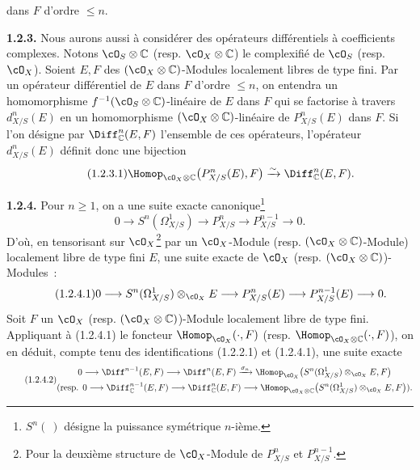 dans $F$ d'ordre $\le n$.

\textbf{1.2.3.} Nous aurons aussi à considérer des opérateurs différentiels à coefficients complexes. Notons $\cO_S\otimes\mathbb C$ (resp. $\cO_X\otimes\mathbb C$) le complexifié de $\cO_S$ (resp. $\cO_X$). Soient $E,F$ des $(\cO_X\otimes\mathbb C)$-Modules localement libres de type fini. Par un opérateur différentiel de $E$ dans $F$ d'ordre $\le n$, on entendra un homomorphisme $f^{-1}(\cO_S\otimes\mathbb C)$-linéaire de $E$ dans $F$ qui se factorise à travers $d^n_{X/S}(E)$ en un homomorphisme $(\cO_X\otimes\mathbb C)$-linéaire de $P^n_{X/S}(E)$ dans $F$. Si l'on désigne par $\Diff^n_\mathbb C(E,F)$ l'ensemble de ces opérateurs, l'opérateur $d^n_{X/S}(E)$ définit donc une bijection
\begin{equation}\tag{1.2.3.1}
  \Homop_{\cO_X\otimes\mathbb C}\bigl(P^n_{X/S}(E),F\bigr)
  \xrightarrow{\sim}
  \Diff^n_\mathbb C(E,F).
\end{equation}

\textbf{1.2.4.} Pour $n\ge1$, on a une suite exacte canonique\footnote{$S^n(\ )$ désigne la puissance symétrique $n$-ième.}
\[
  0\longrightarrow S^n(\Omega^1_{X/S})
  \longrightarrow P^n_{X/S}
  \longrightarrow P^{n-1}_{X/S}
  \longrightarrow 0.
\]
D'où, en tensorisant sur $\cO_X$\footnote{Pour la deuxième structure de $\cO_X$-Module de $P^n_{X/S}$ et $P^{n-1}_{X/S}$.} par un $\cO_X$-Module (resp. $(\cO_X\otimes\mathbb C)$-Module) localement libre de type fini $E$, une suite exacte de $\cO_X$ (resp. $(\cO_X\otimes\mathbb C)$)-Modules~:
\begin{equation}\tag{1.2.4.1}
  0\longrightarrow S^n(\Omega^1_{X/S})\otimes_{\cO_X}E
  \longrightarrow P^n_{X/S}(E)
  \longrightarrow P^{n-1}_{X/S}(E)
  \longrightarrow 0.
\end{equation}
Soit $F$ un $\cO_X$ (resp. $(\cO_X\otimes\mathbb C)$)-Module localement libre de type fini. Appliquant à (1.2.4.1) le foncteur $\Homop_{\cO_X}(\cdot,F)$ (resp. $\Homop_{\cO_X\otimes\mathbb C}(\cdot,F)$), on en déduit, compte tenu des identifications (1.2.2.1) et (1.2.4.1), une suite exacte
\begin{equation}\tag{1.2.4.2}
\begin{gathered}
  0\longrightarrow \Diff^{n-1}(E,F)
  \longrightarrow \Diff^n(E,F)
  \xrightarrow{\sigma_n}
  \Homop_{\cO_X}\bigl(S^n(\Omega^1_{X/S})\otimes_{\cO_X}E,F\bigr)\\
  (\text{resp. } 0\longrightarrow \Diff^{n-1}_\mathbb C(E,F)
  \longrightarrow \Diff^n_\mathbb C(E,F)
  \longrightarrow
  \Homop_{\cO_X\otimes\mathbb C}\bigl(S^n(\Omega^1_{X/S})\otimes_{\cO_X}E,F\bigr)).
\end{gathered}
\end{equation}
